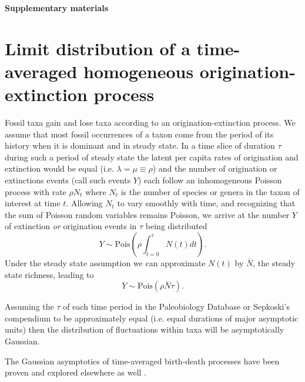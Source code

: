 \documentclass[12pt]{article}
\let\citep=\cite
\begin{document}
\clearpage

\newcommand{\beginsupplement}{%
  \setcounter{table}{0}
  \renewcommand{\thetable}{S\arabic{table}}%
  \setcounter{figure}{0}
  \renewcommand{\thefigure}{S\arabic{figure}}%
  \setcounter{section}{0}
  \renewcommand{\thesection}{S\arabic{section}}%
}

\beginsupplement

\begin{center}
{\LARGE \bf Supplementary materials}
\end{center}
\vspace{2em}

\section{Limit distribution of a time-averaged homogeneous
  origination-extinction process}
\label{sec:suppLimitDist}
Fossil taxa gain and lose taxa according to an origination-extinction
process. We assume that most fossil occurrences of a taxon come from
the period of its history when it is dominant and in steady state. In
a time slice of duration $\tau$ during such a period of steady state
the latent per capita rates of origination and extinction would be
equal (i.e. $\lambda = \mu \equiv \rho$) and the number of origination
or extinctions events (call such events $Y$) each follow an
inhomogeneous Poisson process with rate $\rho N_t$ where $N_t$ is the
number of species or genera in the taxon of interest at time
$t$. Allowing $N_t$ to vary smoothly with time, and recognizing that
the sum of Poisson random variables remains Poisson, we arrive at the
number $Y$ of extinction \emph{or} origination events in $\tau$ being
distributed
\begin{equation}
  \label{eq:eventPois1}
  Y \sim \text{Pois}(\rho \int_{t=0}^\tau N(t) dt).
\end{equation}
Under the steady state assumption we can approximate $N(t)$ by
$\bar{N}$, the steady state richness, leading to
\begin{equation}
  \label{eq:eventPois2}
  Y \sim \text{Pois}(\rho \bar{N} \tau).
\end{equation}

Assuming the $\tau$ of each time period in the Paleobiology Database
or Sepkoski's compendium to be approximately equal (i.e. equal
durations of major asymptotic units) then the distribution of
fluctuations within taxa will be asymptotically Gaussian.

The Gaussian asymptotics of time-averaged birth-death processes have
been proven and explored elsewhere as well \citep{keilson1970,
  grassmann1987}.
\end{document}
